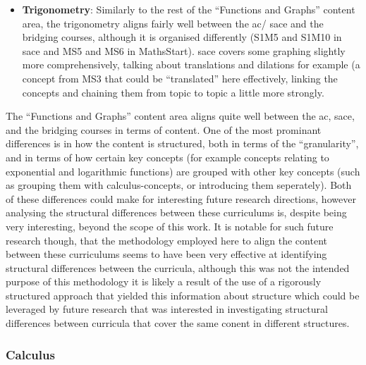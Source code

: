 \documentclass[twoside,12pt,a4paper]{report}
\begin{document}
\begin{itemize}
	\item \textbf{Trigonometry}: Similarly to the rest of the ``Functions and Graphs'' content area, the trigonometry aligns fairly well between the \gls{ac}/ \gls{sace} and the bridging courses, although it is organised differently (S1M5 and S1M10 in \gls{sace} and MS5 and MS6 in MathsStart). \gls{sace} covers some graphing slightly more comprehensively, talking about translations and dilations for example (a concept from MS3 that could be ``translated'' here effectively, linking the concepts and chaining them from topic to topic a little more strongly. 
\end{itemize}

The ``Functions and Graphs'' content area aligns quite well between the \gls{ac}, \gls{sace}, and the bridging courses in terms of content. One of the most prominant differences is in how the content is structured, both in terms of the ``granularity'', and in terms of how certain key concepts (for example concepts relating to exponential and logarithmic functions) are grouped with other key concepts (such as grouping them with calculus-concepts, or introducing them seperately). Both of these differences could make for interesting future research directions, however analysing the structural differences between these curriculums is, despite being very interesting, beyond the scope of this work. It is notable for such future research though, that the methodology employed here to align the content between these curriculums seems to have been very effective at identifying structural differences between the curricula, although this was not the intended purpose of this methodology it is likely a result of the use of a rigorously structured approach that yielded this information about structure which could be leveraged by future research that was interested in investigating structural differences between curricula that cover the same conent in different structures.


\subsubsection{Calculus}
\end{document}
